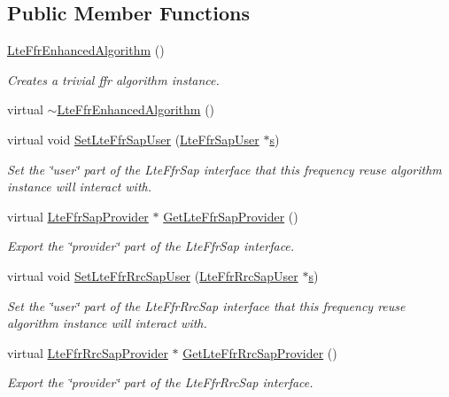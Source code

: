 \subsection*{Public Member Functions}
\begin{DoxyCompactItemize}
\item 
\hyperlink{classns3_1_1LteFfrEnhancedAlgorithm_abedde2b9cfda4fa1901506c4c6a6833a}{Lte\+Ffr\+Enhanced\+Algorithm} ()
\begin{DoxyCompactList}\small\item\em Creates a trivial ffr algorithm instance. \end{DoxyCompactList}\item 
virtual \hyperlink{classns3_1_1LteFfrEnhancedAlgorithm_af00e7c76c0b77a8f14abad65d6ef483f}{$\sim$\+Lte\+Ffr\+Enhanced\+Algorithm} ()
\item 
virtual void \hyperlink{classns3_1_1LteFfrEnhancedAlgorithm_a80821f8b82d09f09ec3d0923d2049f3f}{Set\+Lte\+Ffr\+Sap\+User} (\hyperlink{classns3_1_1LteFfrSapUser}{Lte\+Ffr\+Sap\+User} $\ast$\hyperlink{generate__test__data__lte__sinr_8m_ad83eeb3a142285d1243a08c6b7026df8}{s})
\begin{DoxyCompactList}\small\item\em Set the \char`\"{}user\char`\"{} part of the Lte\+Ffr\+Sap interface that this frequency reuse algorithm instance will interact with. \end{DoxyCompactList}\item 
virtual \hyperlink{classns3_1_1LteFfrSapProvider}{Lte\+Ffr\+Sap\+Provider} $\ast$ \hyperlink{classns3_1_1LteFfrEnhancedAlgorithm_a711fcdc57957bda43659bf49f2b56699}{Get\+Lte\+Ffr\+Sap\+Provider} ()
\begin{DoxyCompactList}\small\item\em Export the \char`\"{}provider\char`\"{} part of the Lte\+Ffr\+Sap interface. \end{DoxyCompactList}\item 
virtual void \hyperlink{classns3_1_1LteFfrEnhancedAlgorithm_a217b3a99aa451c2fb189545b6d0b6d97}{Set\+Lte\+Ffr\+Rrc\+Sap\+User} (\hyperlink{classns3_1_1LteFfrRrcSapUser}{Lte\+Ffr\+Rrc\+Sap\+User} $\ast$\hyperlink{generate__test__data__lte__sinr_8m_ad83eeb3a142285d1243a08c6b7026df8}{s})
\begin{DoxyCompactList}\small\item\em Set the \char`\"{}user\char`\"{} part of the Lte\+Ffr\+Rrc\+Sap interface that this frequency reuse algorithm instance will interact with. \end{DoxyCompactList}\item 
virtual \hyperlink{classns3_1_1LteFfrRrcSapProvider}{Lte\+Ffr\+Rrc\+Sap\+Provider} $\ast$ \hyperlink{classns3_1_1LteFfrEnhancedAlgorithm_a7134b9587c94de4aa2dcab38500e58d0}{Get\+Lte\+Ffr\+Rrc\+Sap\+Provider} ()
\begin{DoxyCompactList}\small\item\em Export the \char`\"{}provider\char`\"{} part of the Lte\+Ffr\+Rrc\+Sap interface. \end{DoxyCompactList}\end{DoxyCompactItemize}
